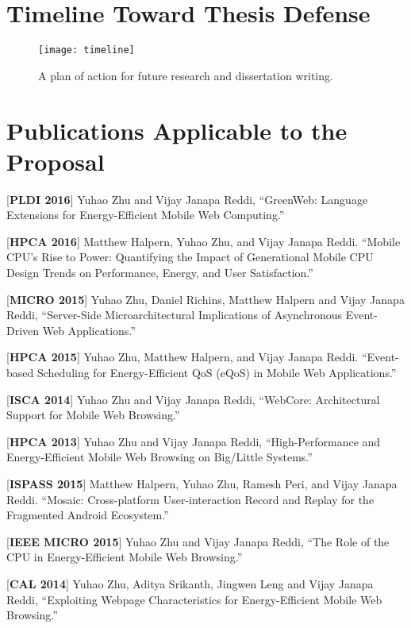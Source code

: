 
\setcounter{secnumdepth}{0}

\section{Timeline Toward Thesis Defense}

\begin{figure}[h]
  \centering
  \captionsetup{width=\columnwidth}
  \texttt{[image: timeline]}
  \caption{\small{A plan of action for future research and dissertation writing.}}
  \label{fig:timeline}
\end{figure}

\section{Publications Applicable to the Proposal}

[\textbf{PLDI 2016}] Yuhao Zhu and Vijay Janapa Reddi, ``GreenWeb: Language Extensions for Energy-Efficient Mobile Web Computing.''

[\textbf{HPCA 2016}] Matthew Halpern, Yuhao Zhu, and Vijay Janapa Reddi. ``Mobile CPU's Rise to Power: Quantifying the Impact of Generational Mobile CPU Design Trends on Performance, Energy, and User Satisfaction.''

[\textbf{MICRO 2015}] Yuhao Zhu, Daniel Richins, Matthew Halpern and Vijay Janapa Reddi, ``Server-Side Microarchitectural Implications of Asynchronous Event-Driven Web Applications.''

[\textbf{HPCA 2015}] Yuhao Zhu, Matthew Halpern, and Vijay Janapa Reddi. ``Event-based Scheduling for Energy-Efficient QoS (eQoS) in Mobile Web Applications.''

[\textbf{ISCA 2014}] Yuhao Zhu and Vijay Janapa Reddi, ``WebCore: Architectural Support for Mobile Web Browsing.''

[\textbf{HPCA 2013}] Yuhao Zhu and Vijay Janapa Reddi, ``High-Performance and Energy-Efficient Mobile Web Browsing on Big/Little Systems.''

[\textbf{ISPASS 2015}] Matthew Halpern, Yuhao Zhu, Ramesh Peri, and Vijay Janapa Reddi. ``Mosaic: Cross-platform User-interaction Record and Replay for the Fragmented Android Ecosystem.''

[\textbf{IEEE MICRO 2015}] Yuhao Zhu and Vijay Janapa Reddi, ``The Role of the CPU in Energy-Efficient Mobile Web Browsing.''

[\textbf{CAL 2014}] Yuhao Zhu, Aditya Srikanth, Jingwen Leng and Vijay Janapa Reddi, ``Exploiting Webpage Characteristics for Energy-Efficient Mobile Web Browsing.''

